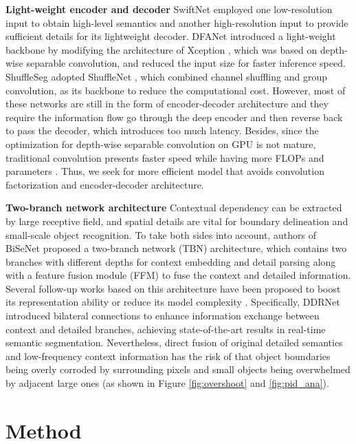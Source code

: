 \documentclass[10pt,twocolumn,letterpaper]{article}
\begin{document}
{\bf Light-weight encoder and decoder}
SwiftNet \cite{swiftnet} employed one low-resolution input to obtain high-level semantics and another high-resolution input to provide sufficient details for its lightweight decoder. DFANet \cite{dfanet} introduced a light-weight backbone by modifying the architecture of Xception \cite{xception}, which was based on depth-wise separable convolution, and reduced the input size for faster inference speed. 
ShuffleSeg \cite{shuffleseg} adopted ShuffleNet \cite{shufflenet}, which combined channel shuffling and group convolution, as its backbone to reduce the computational cost. However, most of these networks are still in the form of encoder-decoder architecture and they require the information flow go through the deep encoder and then reverse back to pass the decoder, which introduces too much latency. Besides, since the optimization for depth-wise separable convolution on GPU is not mature, traditional convolution presents faster speed while having more FLOPs and parameters \cite{swiftnet}. Thus, we seek for more efficient model that avoids convolution factorization and encoder-decoder architecture.

{\bf Two-branch network architecture}
Contextual dependency can be extracted by large receptive field, and spatial details are vital for boundary delineation and small-scale object recognition. To take both sides into account, authors of BiSeNet \cite{bisenet} proposed a two-branch network (TBN) architecture, which contains two branches with different depths for context embedding and detail parsing along with a feature fusion module (FFM) to fuse the context and detailed information. 
Several follow-up works based on this architecture have been proposed to boost its representation ability or reduce its model complexity \cite{fast_scnn, contextnet, bisenetv2}. Specifically, DDRNet \cite{ddrnet} introduced bilateral connections to enhance information exchange between context and detailed branches, achieving state-of-the-art results in real-time semantic segmentation. Nevertheless, direct fusion of original detailed semantics and low-frequency context information has the risk of that object boundaries being overly corroded by surrounding pixels and small objects being overwhelmed by adjacent large ones (as shown in Figure \ref{fig:overshoot} and \ref{fig:pid_ana}). 






\section{Method}
\label{sec:method}
\end{document}
